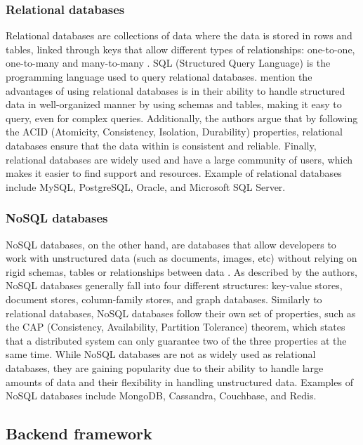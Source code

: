 \subsubsection{Relational databases}

Relational databases are collections of data where the data is stored in rows and tables, linked through keys that allow different types of relationships: one-to-one, one-to-many and many-to-many \parencite{databases}. SQL (Structured Query Language) is the programming language used to query relational databases. \textcite{databases} mention the advantages of using relational databases is in their ability to handle structured data in well-organized manner by using schemas and tables, making it easy to query, even for complex queries. Additionally, the authors argue that by following the ACID (Atomicity, Consistency, Isolation, Durability) properties, relational databases ensure that the data within is consistent and reliable. Finally, relational databases are widely used and have a large community of users, which makes it easier to find support and resources. Example of relational databases include MySQL, PostgreSQL, Oracle, and Microsoft SQL Server.

\subsubsection{NoSQL databases}

NoSQL databases, on the other hand, are databases that allow developers to work with unstructured data (such as documents, images, etc) without relying on rigid schemas, tables or relationships between data \parencite{databases}. As described by the authors, NoSQL databases generally fall into four different structures: key-value stores, document stores, column-family stores, and graph databases. Similarly to relational databases, NoSQL databases follow their own set of properties, such as the CAP (Consistency, Availability, Partition Tolerance) theorem, which states that a distributed system can only guarantee two of the three properties at the same time. While NoSQL databases are not as widely used as relational databases, they are gaining popularity due to their ability to handle large amounts of data and their flexibility in handling unstructured data. Examples of NoSQL databases include MongoDB, Cassandra, Couchbase, and Redis.

\subsection{Backend framework}

